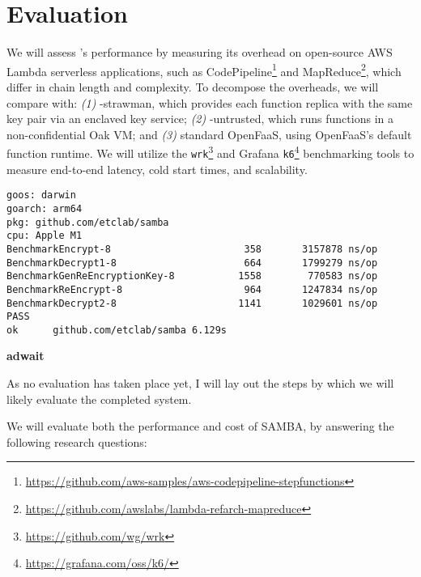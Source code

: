 \section{Evaluation}
\label{sec:evaluation}


%
We will assess \SystemName's performance by measuring its overhead on
open-source AWS Lambda serverless applications, such as
CodePipeline\footnote{\url{https://github.com/aws-samples/aws-codepipeline-stepfunctions}}
and
MapReduce\footnote{\url{https://github.com/awslabs/lambda-refarch-mapreduce}},
which differ in chain length and complexity.
%
To decompose the overheads, we will compare \SystemName with: \emph{(1)}
\SystemName-strawman, which provides each function replica with the same key
pair via an enclaved key service; \emph{(2)} \SystemName-untrusted, which runs
functions in a non-confidential Oak VM; and \emph{(3)} standard OpenFaaS, using
OpenFaaS's default function runtime.
%
We will utilize the \texttt{wrk}\footnote{\url{https://github.com/wg/wrk}} and
Grafana \texttt{k6}\footnote{\url{https://grafana.com/oss/k6/}} benchmarking
tools to measure end-to-end latency, cold start times, and scalability.


{\footnotesize
\begin{verbatim}goos: darwin
goarch: arm64
pkg: github.com/etclab/samba
cpu: Apple M1
BenchmarkEncrypt-8              	     358	   3157878 ns/op
BenchmarkDecrypt1-8             	     664	   1799279 ns/op
BenchmarkGenReEncryptionKey-8   	    1558	    770583 ns/op
BenchmarkReEncrypt-8            	     964	   1247834 ns/op
BenchmarkDecrypt2-8             	    1141	   1029601 ns/op
PASS
ok  	github.com/etclab/samba	6.129s
\end{verbatim}
}


\textbf{adwait}

As no evaluation has taken place yet, I will lay out the steps by which we will likely evaluate the completed system. 

We will evaluate both the performance and cost of SAMBA, by answering the following research questions:


